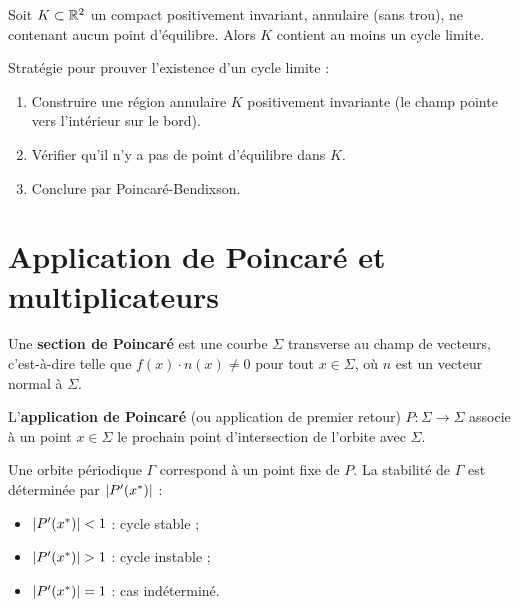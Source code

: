 \begin{corollaire}
Soit $K \subset \mathbb{R}^2$ un compact positivement invariant, annulaire (sans
trou), ne contenant aucun point d'\'equilibre. Alors $K$ contient au moins
un cycle limite.
\end{corollaire}

\begin{intuition}
Strat\'egie pour prouver l'existence d'un cycle limite :
\begin{enumerate}
    \item Construire une r\'egion annulaire $K$ positivement invariante
    (le champ pointe vers l'int\'erieur sur le bord).
    \item V\'erifier qu'il n'y a pas de point d'\'equilibre dans $K$.
    \item Conclure par Poincar\'e-Bendixson.
\end{enumerate}
\end{intuition}

\section{Application de Poincar\'e et multiplicateurs}

\begin{definition}
Une \textbf{section de Poincar\'e} est une courbe $\Sigma$ transverse au
champ de vecteurs, c'est-\`a-dire telle que $f(x) \cdot n(x) \neq 0$ pour
tout $x \in \Sigma$, o\`u $n$ est un vecteur normal \`a $\Sigma$.
\end{definition}

\begin{definition}
L'\textbf{application de Poincar\'e} (ou application de premier retour)
$P : \Sigma \to \Sigma$ associe \`a un point $x \in \Sigma$ le prochain point
d'intersection de l'orbite avec $\Sigma$.
\end{definition}

\begin{proposition}
Une orbite p\'eriodique $\Gamma$ correspond \`a un point fixe de $P$.
La stabilit\'e de $\Gamma$ est d\'etermin\'ee par $\left| P'(x^*) \right|$ :
\begin{itemize}
    \item $\left| P'(x^*) \right| < 1$ : cycle stable ;
    \item $\left| P'(x^*) \right| > 1$ : cycle instable ;
    \item $\left| P'(x^*) \right| = 1$ : cas ind\'etermin\'e.
\end{itemize}
\end{proposition}


